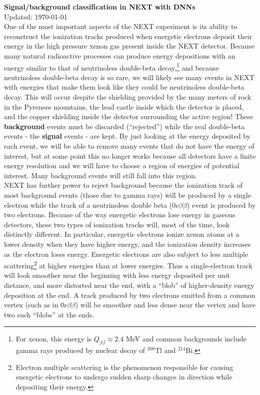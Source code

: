 \documentclass[10pt]{article}
\begin{document}
{\noindent\Large{\textbf{Signal/background classification in NEXT with DNNs}}}\\
Updated: \today\\ %

\noindent One of the most important aspects of the NEXT experiment is its ability to reconstruct the ionization tracks produced when energetic electrons deposit their
energy in the high pressure xenon gas present inside the NEXT detector.  Because many natural radioactive processes can produce energy depositions with an energy similar 
to that of neutrinoless double-beta decay,\footnote{For xenon, this energy is $Q_{\beta\beta} \approx 2.4$ MeV and common backgrounds include gamma rays produced by nuclear
decay of $^{208}$Tl and $^{214}$Bi.} and because neutrinoless double-beta decay is so rare, we will likely see many events in NEXT with energies that make them look like they could be
neutrinoless double-beta decay.  This will occur despite the shielding provided by the many meters of rock in the Pyrenees mountains, the lead castle inside which the detector is placed, and
the copper shielding inside the detector surrounding the active region!  These \textbf{background} events must be discarded (``rejected'') while the real double-beta events - the \textbf{signal} 
events - are kept.  By just looking at the energy deposited by each event, we will be able to remove many events that do not have the energy of interest, but at some point this no longer works
because all detectors have a finite energy resolution and we will have to choose a region of energies of potential interest.  Many background events will still fall into this region.\\

\noindent NEXT has further power to reject background because the ionization track of most background events (those due to gamma rays) will be produced by a single electron while the
track of a neutrinoless double beta ($0\nu\beta\beta$) event is produced by two electrons.  Because of the way energetic electrons lose energy in gaseous detectors, these two types of
ionization tracks will, most of the time, look distinctly different.  In particular, energetic electrons ionize xenon atoms at a lower density when they have higher energy, and the ionization density
increases as the electron loses energy.  Energetic electrons are also subject to less multiple scattering\footnote{Electron multiple scattering is the phenomenon responsible for
causing energetic electrons to undergo sudden sharp changes in direction while depositing their energy.} at higher energies than at lower energies.  Thus a single-electron track will look smoother
near the beginning with less energy deposited per unit distance, and more distorted near the end, with a ``blob'' of higher-density energy deposition at the end.  A track produced by two electrons
emitted from a common vertex (such as in $0\nu\beta\beta$) will be smoother and less dense near the vertex and have two such ``blobs'' at the ends.\\
\end{document}
